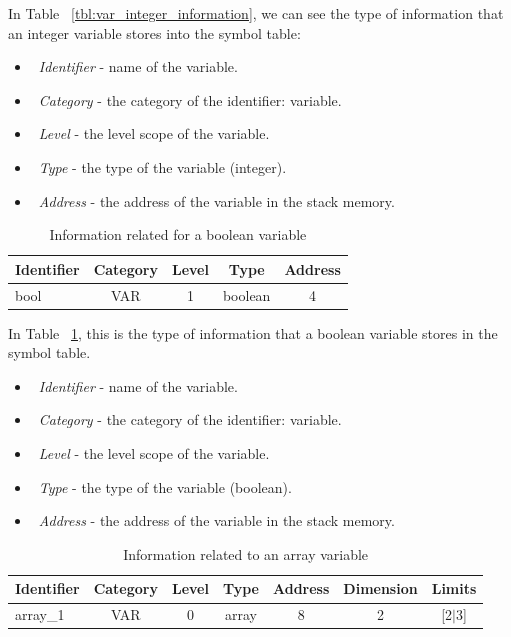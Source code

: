 \documentclass[
  oneside,
  11pt, a4paper,
  footinclude=true,
  headinclude=true,
  cleardoublepage=empty
]{scrbook}
\begin{document}
In Table ~\ref{tbl:var_integer_information}, we can see the type of information that an integer variable stores into the symbol table:
\begin{itemize}
\item ~\textit{Identifier} - name of the variable.
\item ~\textit{Category} - the category of the identifier: variable.
\item ~\textit{Level} - the level scope of the variable.
\item ~\textit{Type} - the type of the variable (integer).
\item ~\textit{Address} - the address of the variable in the stack memory.
\end{itemize}

\newpage

\begin{table}[h!]
\centering
\caption{Information related for a boolean variable}
\label{tbl:var_boolean_information}
\begin{tabular}{l|c|c|c|c}
\multicolumn{1}{c|}{Identifier} & Category & Level & Type    & Address \\ \hline
bool                            & VAR      & 1     & boolean & 4      
\end{tabular}
\end{table}

In Table ~\ref{tbl:var_boolean_information}, this is the type of information that a boolean variable stores in the symbol table.

\begin{itemize}
\item ~\textit{Identifier} - name of the variable.
\item ~\textit{Category} - the category of the identifier: variable.
\item ~\textit{Level} - the level scope of the variable.
\item ~\textit{Type} - the type of the variable (boolean).
\item ~\textit{Address} - the address of the variable in the stack memory.
\end{itemize}

\begin{table}[h!]
\centering
\caption{Information related to an array variable}
\label{tbl:var_array_information}
\begin{tabular}{l|c|c|c|c|l|l}
\multicolumn{1}{c|}{Identifier} & Category & Level & Type    & Address & Dimension              & Limits                        \\ \hline
array\_1                        & VAR      & 0     & array & 8       & \multicolumn{1}{c|}{2} & \multicolumn{1}{c}{{[}2$|$3{]}}
\end{tabular}
\end{table}
\end{document}
